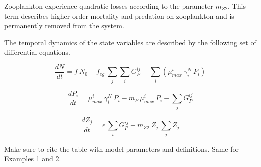 \documentclass[journal abbreviation, manuscript]{copernicus}
\begin{document}
Zooplankton experience quadratic losses according to the parameter $m_{Z2}$. This term describes higher-order mortality and predation on zooplankton and is permanently removed from the system.

The temporal dynamics of the state variables are described by the following set of differential equations.

\begin{equation}
    \frac{d N}{d t} = 
    f \ N_0 %
    +  f_{eg} \ \sum_{j} \sum_{i} G_P^{ij} %
    - \sum_{i} ( \mu_{max}^i \ \gamma_i^N \ P_i) %
\end{equation}

\begin{equation}
    \frac{d P_i}{d t} =
    \mu_{max}^i \  \gamma_i^N \   P_i  %
    - m_P  \ \mu_{max}^i \ P_i %
    - \sum_{j} G_P^{ij} %
\end{equation}

\begin{equation}
    \frac{d Z_j}{d t} =
    \epsilon \ \sum_{i} G_P^{ij} %
    - m_{Z2} \ Z_j \ \sum_{j} Z_j  %
\end{equation}

Make sure to cite the table with model parameters and definitions. Same for Examples 1 and 2.
\end{document}
